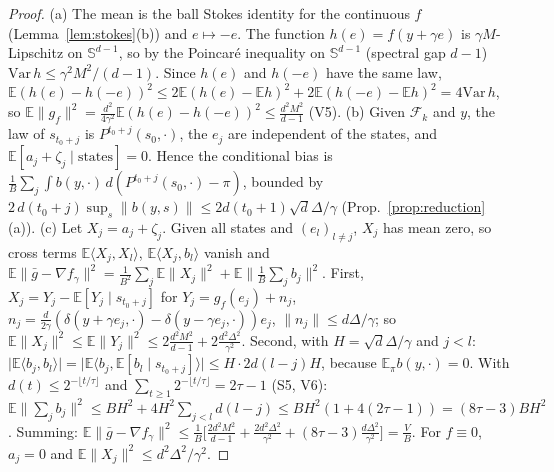 \documentclass[11pt,a4paper]{article}
\numberwithin{equation}{section}
\theoremstyle{definition}
\theoremstyle{remark}
\newcommand{\E}{\mathbb E}\newcommand{\R}{\mathbb R}\newcommand{\N}{\mathbb N}\newcommand{\Prob}{\mathbb P}
\newcommand{\norm}[1]{\lVert #1\rVert}\newcommand{\abs}[1]{\lvert #1\rvert}\newcommand{\ip}[2]{\langle #1,#2\rangle}
\newcommand{\Sph}{\mathbb S^{d-1}}\newcommand{\Ball}{\mathbb B}
\begin{document}
\begin{proof}
(a) The mean is the ball Stokes identity for the continuous $f$ (Lemma~\ref{lem:stokes}(b)) and $e\mapsto-e$. The function $h(e)=f(y+\gamma e)$ is $\gamma M$-Lipschitz on $\Sph$, so by the Poincaré inequality on $\Sph$ (spectral gap $d-1$) $\mathrm{Var}\,h\le\gamma^2M^2/(d-1)$. Since $h(e)$ and $h(-e)$ have the same law, $\E(h(e)-h(-e))^2\le2\E(h(e)-\E h)^2+2\E(h(-e)-\E h)^2=4\mathrm{Var}\,h$, so $\E\norm{g_f}^2=\frac{d^2}{4\gamma^2}\E(h(e)-h(-e))^2\le\frac{d^2M^2}{d-1}$ (V5).
(b) Given $\mathcal F_k$ and $y$, the law of $s_{t_0+j}$ is $P^{t_0+j}(s_0,\cdot)$, the $e_j$ are independent of the states, and $\E[a_j+\zeta_j\mid\text{states}]=0$. Hence the conditional bias is $\frac1B\sum_j\int b(y,\cdot)\,d(P^{t_0+j}(s_0,\cdot)-\pi)$, bounded by $2\,d(t_0+j)\sup_s\norm{b(y,s)}\le2d(t_0+1)\sqrt d\Delta/\gamma$ (Prop.~\ref{prop:reduction}(a)).
(c) Let $X_j=a_j+\zeta_j$. Given all states and $(e_l)_{l\ne j}$, $X_j$ has mean zero, so cross terms $\E\ip{X_j}{X_l}$, $\E\ip{X_j}{b_l}$ vanish and
$\E\norm{\bar g-\nabla f_\gamma}^2=\frac1{B^2}\sum_j\E\norm{X_j}^2+\E\norm{\tfrac1B\sum_jb_j}^2$.
First, $X_j=Y_j-\E[Y_j\mid s_{t_0+j}]$ for $Y_j=g_f(e_j)+n_j$, $n_j=\frac d{2\gamma}(\delta(y+\gamma e_j,\cdot)-\delta(y-\gamma e_j,\cdot))e_j$, $\norm{n_j}\le d\Delta/\gamma$; so $\E\norm{X_j}^2\le\E\norm{Y_j}^2\le2\frac{d^2M^2}{d-1}+2\frac{d^2\Delta^2}{\gamma^2}$.
Second, with $H=\sqrt d\Delta/\gamma$ and $j<l$: $\abs{\E\ip{b_j}{b_l}}=\abs{\E\ip{b_j}{\E[b_l\mid s_{t_0+j}]}}\le H\cdot2d(l-j)H$, because $\E_\pi b(y,\cdot)=0$. With $d(t)\le2^{-\lfloor t/\tau\rfloor}$ and $\sum_{t\ge1}2^{-\lfloor t/\tau\rfloor}=2\tau-1$ (S5, V6):
$\E\norm{\sum_jb_j}^2\le BH^2+4H^2\sum_{j<l}d(l-j)\le BH^2(1+4(2\tau-1))=(8\tau-3)BH^2$.
Summing: $\E\norm{\bar g-\nabla f_\gamma}^2\le\frac1B\big[\frac{2d^2M^2}{d-1}+\frac{2d^2\Delta^2}{\gamma^2}+(8\tau-3)\frac{d\Delta^2}{\gamma^2}\big]=\frac VB$. For $f\equiv0$, $a_j=0$ and $\E\norm{X_j}^2\le d^2\Delta^2/\gamma^2$.
\end{proof}
\end{document}
